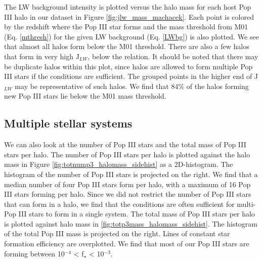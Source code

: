 \documentclass[a4paper,fleqn,usenatbib]{mnras}
\begin{document}
The LW background intensity is plotted versus the halo mass for each host Pop III halo in our dataset in Figure \ref{fig:jlw_mass_machacek}. Each point is colored by the redshift where the Pop III star forms and the mass threshold from M01 (Eq. \ref{mthresh}) for the given LW background (Eq. \ref{LWbg}) is also plotted. We see that almost all halos form below the M01 threshold. There are also a few halos that form in very high J$_{LW}$, below the relation. It should be noted that there may be duplicate halos within this plot, since halos are allowed to form multiple Pop III stars if the conditions are sufficient. The grouped points in the higher end of J$_{LW}$ may be representative of such halos. We find that 84\% of the halos forming new Pop III stars lie below the M01 mass threshold. 

\subsection{Multiple stellar systems}

We can also look at the number of Pop III stars and the total mass of Pop III stars per halo. The number of Pop III stars per halo is plotted against the halo mass in Figure \ref{fig:totnump3_halomass_sidehist} as a 2D-histogram. The histogram of the number of Pop III stars is projected on the right. We find that a median number of four Pop III stars form per halo, with a maximum of 16 Pop III stars forming per halo. Since we did not restrict the number of Pop III stars that can form in a halo, we find that the conditions are often sufficient for multi-Pop III stars to form in a single system. The total mass of Pop III stars per halo is plotted against halo mass in \autoref{fig:totp3mass_halomass_sidehist}. The histogram of the total Pop III mass is projected on the right. Lines of constant star formation efficiency are overplotted. We find that most of our Pop III stars are forming between 10$^{-4}$ < f$_\star$ < 10$^{-3}$. 
\end{document}
